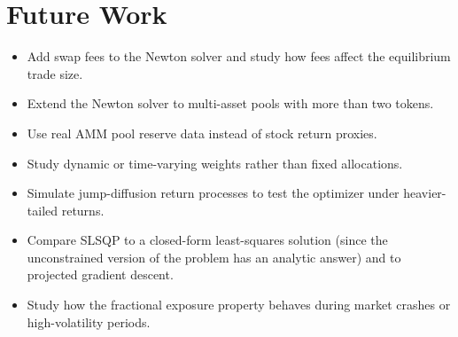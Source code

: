\documentclass[12pt]{article}
\begin{document}
\section{Future Work}

\begin{itemize}
    \item Add swap fees to the Newton solver and study how fees affect the equilibrium trade size.
    \item Extend the Newton solver to multi-asset pools with more than two tokens.
    \item Use real AMM pool reserve data instead of stock return proxies.
    \item Study dynamic or time-varying weights rather than fixed allocations.
    \item Simulate jump-diffusion return processes to test the optimizer under heavier-tailed returns.
    \item Compare SLSQP to a closed-form least-squares solution (since the unconstrained version of the problem has an analytic answer) and to projected gradient descent.
    \item Study how the fractional exposure property behaves during market crashes or high-volatility periods.
\end{itemize}
\end{document}

